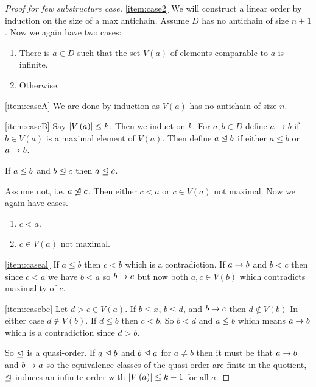 \documentclass{amsart}
\begin{document}
\begin{proof}[Proof for few substructure case]
\ref{item:case2} 
We will construct a linear order by induction on the size of a max antichain. 
Assume $D$ has no antichain of size $n+1$. Now we again have two cases:
\begin{enumerate}[label = \textit{Case \ABC:}]
\item There is $a\in D$ such that the set $V\left(a\right)$ of elements comparable to $a$
is infinite.
\label{item:caseA}
\item Otherwise.
\label{item:caseB}
\end{enumerate}

\ref{item:caseA} We are done by induction as $V\left(a\right)$ has no antichain of size
$n$.

\ref{item:caseB} 
Say $\left| V\left(a\right) \right|\leq k$. Then we induct on $k$. 
For $a,b\in D$ define $a\to b$ if $b\in V\left(a\right)$ is a maximal element of
$V\left(a\right)$. 
Then define $a\trianglelefteq b$ if either $a\leq b$ or $a\rightarrow b$. 
\begin{clm}
If $a\trianglelefteq b$ and $b\trianglelefteq c$ then $a\trianglelefteq c$.
\end{clm}
Assume not, i.e. $a\not\trianglelefteq c$. Then either $c < a$ or $c\in V\left(a\right)$ not
maximal.
Now we again have cases.

\begin{enumerate}[label = \textit{Case \albe:}]
\item $c<a$.
\label{item:caseal}
\item $c\in V\left(a\right)$ not maximal.
\label{item:casebe}
\end{enumerate}

\ref{item:caseal}
If $a\leq b$ then $c < b$ which is a contradiction.
If $a\rightarrow b$ and $b < c$ then since $c<a$ we have $b<a$ so $b\rightarrow c$ but now both
$a,c\in V\left(b\right)$ which contradicts maximality of $c$.

\ref{item:casebe}
Let $d > c\in V\left(a\right)$. 
If $b\leq x$, $b\leq d$, and $b\rightarrow c$ then $d\not\in V\left(b\right)$ In either case
$d\not\in V\left(b\right)$. 
If $d\leq b$ then $c< b$. 
So $b< d$ and $a\not\leq b$ which means $a\rightarrow b$ which is a contradiction since $d > b$.

So $\trianglelefteq$ is a quasi-order.
If $a\trianglelefteq b$ and $b\trianglelefteq a$ for $a\neq b$ then it must be that $a\rightarrow b$ and
$b\rightarrow a$ so the equivalence classes of the quasi-order are finite in the quotient,
$\trianglelefteq$ induces an infinite order with 
$\left| V\left(a\right) \right|\leq k-1$ for all $a$.
\end{proof}
\end{document}
